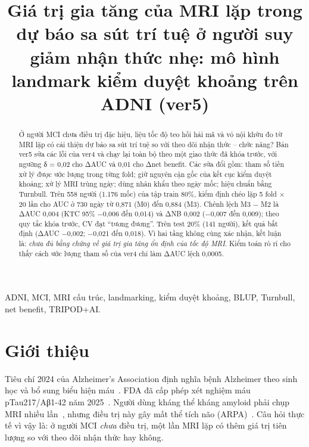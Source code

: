 \documentclass[conference]{IEEEtran}
\begin{document}
\title{Giá trị gia tăng của MRI lặp trong dự báo sa sút trí tuệ ở người suy giảm nhận thức nhẹ: mô hình landmark kiểm duyệt khoảng trên ADNI (ver5)}

\author{
}

\maketitle

\begin{abstract}
Ở người MCI chưa điều trị đặc hiệu, liệu tốc độ teo hồi hải mã và vỏ nội khứu đo từ MRI lặp có cải thiện dự báo sa sút trí tuệ so với theo dõi nhận thức – chức năng? Bản ver5 sửa các lỗi của ver4 và chạy lại toàn bộ theo một giao thức đã khóa trước, với ngưỡng δ = 0,02 cho ΔAUC và 0,01 cho Δnet benefit. Các sửa đổi gồm: tham số tiền xử lý được ước lượng trong từng fold; giữ nguyên cận gốc của kết cục kiểm duyệt khoảng; xử lý MRI trùng ngày; dùng nhân khẩu theo ngày mốc; hiệu chuẩn bằng Turnbull. Trên 558 người (1.176 mốc) của tập train 80\%, kiểm định chéo lặp 5 fold × 20 lần cho AUC ở 730 ngày từ 0,871 (M0) đến 0,884 (M3). Chênh lệch M3 − M2 là ΔAUC 0,004 (KTC 95\% −0,006 đến 0,014) và ΔNB 0,002 (−0,007 đến 0,009); theo quy tắc khóa trước, CV đạt ``tương đương''. Trên test 20\% (141 người), kết quả bất định (ΔAUC −0,002; −0,021 đến 0,018). Vì hai tầng không cùng xác nhận, kết luận là: \emph{chưa đủ bằng chứng về giá trị gia tăng ổn định của tốc độ MRI}. Kiểm toán rò rỉ cho thấy cách ước lượng tham số của ver4 chỉ làm ΔAUC lệch 0,0005.
\end{abstract}

\begin{IEEEkeywords}
ADNI, MCI, MRI cấu trúc, landmarking, kiểm duyệt khoảng, BLUP, Turnbull, net benefit, TRIPOD+AI.
\end{IEEEkeywords}

\section{Giới thiệu}
Tiêu chí 2024 của Alzheimer's Association định nghĩa bệnh Alzheimer theo sinh học và bổ sung biểu hiện máu~\cite{jack2024}. FDA đã cấp phép xét nghiệm máu pTau217/Aβ1-42 năm 2025~\cite{fda2025}. Người dùng kháng thể kháng amyloid phải chụp MRI nhiều lần~\cite{ema}, nhưng điều trị này gây mất thể tích não (ARPA)~\cite{belder2024}. Câu hỏi thực tế vì vậy là: ở người MCI \emph{chưa} điều trị, một lần MRI lặp có thêm giá trị tiên lượng so với theo dõi nhận thức hay không.
\end{document}
